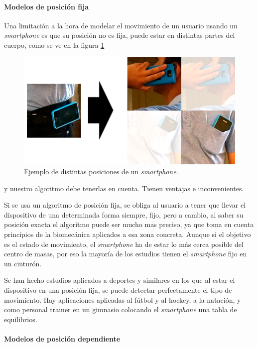 \documentclass[12pt]{article}
\numberwithin{equation}{section}
\begin{document}
{\paragraph{Modelos de posición fija}
Una limitación a la hora de modelar el movimiento de un usuario usando un \textit{smartphone} es que su posición no es fija, puede estar en distintas partes del cuerpo, como se ve en la figura \ref{fig:posiciones}
\begin{figure}[h]
    \centering
    \includegraphics[width=1\textwidth]{position.png}
    \caption{Ejemplo de distintas posiciones de un \textit{smartphone}.}
    \label{fig:posiciones}
\end{figure}

y nuestro algoritmo debe tenerlas en cuenta. Tienen ventajas e inconvenientes. 

Si se usa un algoritmo de posición fija, se obliga al usuario a tener que llevar el dispositivo de una determinada forma siempre, fijo, pero a cambio, al saber su posición exacta el algoritmo puede ser mucho mas preciso, ya que toma en cuenta principios de la biomecánica aplicados a esa zona concreta. Aunque si el objetivo es el estado de movimiento, el \textit{smartphone} ha de estar lo más cerca posible del centro de masas, por eso la mayoría de los estudios tienen el \textit{smartphone} fijo en un cinturón\cite{5673816}.

Se han hecho estudios aplicados a deportes y similares en los que al estar el dispositivo en una posición fija, se puede detectar perfectamente el tipo de movimiento. Hay aplicaciones aplicadas al fútbol\cite{s130405317} y al hockey, a la natación\cite{Marshall:2013:SSD:2494091.2496036}, y como personal trainer en un gimnasio colocando el \textit{smartphone} una tabla de equilibrios\cite{KRANZ2013203}.

\paragraph{Modelos de posición dependiente}

}
\end{document}
